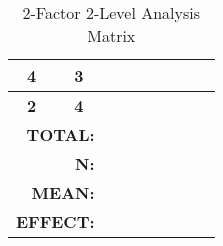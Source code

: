 \begin{table}[]
\begin{tabular}{|c|l|c|l|l|l|l|l|l|l|l|l|}
		\multicolumn{2}{|c|}{\textbf{4}}                                              & \multicolumn{2}{c|}{\textbf{3}}                                               & \multicolumn{2}{l|}{}                                                        & \cellcolor[HTML]{000000}        &                                                 &                                 & \cellcolor[HTML]{000000}        &                                 & \cellcolor[HTML]{000000}        \\ \hline
		\multicolumn{2}{|c|}{\textbf{2}}                                              & \multicolumn{2}{c|}{\textbf{4}}                                               & \multicolumn{2}{l|}{}                                                        & \cellcolor[HTML]{000000}        &                                                 & \cellcolor[HTML]{000000}        &                                 & \cellcolor[HTML]{000000}        &                                 \\ \hline
		\multicolumn{4}{|r|}{\textbf{TOTAL:}}                                                                                                                         & \multicolumn{2}{l|}{}                                                        &                                 &                                                 &                                 &                                 &                                 &                                 \\ \hline
		\multicolumn{4}{|r|}{\textbf{N:}}                                                                                                                             & \multicolumn{2}{l|}{}                                                        &                                 &                                                 &                                 &                                 &                                 &                                 \\ \hline
		\multicolumn{4}{|r|}{\textbf{MEAN:}}                                                                                                                          & \multicolumn{2}{l|}{}                                                        &                                 &                                                 &                                 &                                 &                                 &                                 \\ \hline
		\multicolumn{4}{|r|}{\textbf{EFFECT:}}                                                                                                                        & \multicolumn{2}{l|}{\cellcolor[HTML]{000000}}                                & \multicolumn{2}{l|}{}                                                             & \multicolumn{2}{l|}{}                                             & \multicolumn{2}{l|}{}                                             \\ \hline
	\end{tabular}\caption{2-Factor 2-Level Analysis Matrix}\label{2fac2lev_matrix}
\end{table}